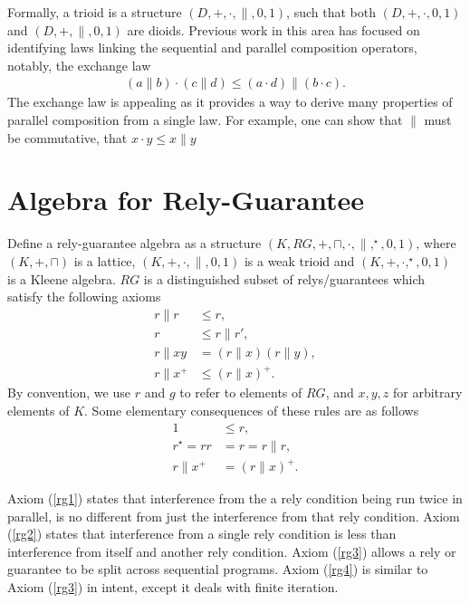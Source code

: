 \documentclass{llncs}
\begin{document}
Formally, a trioid is a structure $(D,+,\cdot,\|,0,1)$, such that
both $(D,+,\cdot,0,1)$ and $(D,+,\|,0,1)$ are dioids. Previous work in
this area has focused on identifying laws linking the sequential and
parallel composition operators, notably, the exchange law
\begin{align*}
  (a \| b) \cdot (c \| d) \le (a \cdot d) \| (b \cdot c).
\end{align*}
The exchange law is appealing as it provides a way to derive many
properties of parallel composition from a single law. For example, one
can show that $\|$ must be commutative, that $x \cdot y \le x \| y$

\newpage
\section{Algebra for Rely-Guarantee}
\label{sec:RG}

Define a rely-guarantee algebra as a structure
$(K,RG,+,\sqcap,\cdot,\|,^\star,0,1)$, where $(K,+,\sqcap)$ is a
lattice, $(K,+,\cdot,\|,0,1)$ is a weak trioid and
$(K,+,\cdot,^\star,0,1)$ is a Kleene algebra. $RG$ is a distinguished
subset of relys/guarantees which satisfy the following axioms
\begin{align}
r\|r &\le r, \label{rg1}\\
r &\le r\|r', \label{rg2}\\
r\|xy &= (r\|x)(r\|y), \label{rg3}\\
r\|x^+ &\le (r\|x)^+ \label{rg4}.
\end{align}
By convention, we use $r$ and $g$ to refer to elements of $RG$, and
$x,y,z$ for arbitrary elements of $K$. Some elementary consequences of these rules are as follows
\begin{align*}
1 &\le r,\\
r^\star = rr &= r = r\|r,\\
r\|x^+ &= (r\|x)^+.
\end{align*}


Axiom (\ref{rg1}) states that interference from the a rely condition
being run twice in parallel, is no different from just the
interference from that rely condition. Axiom (\ref{rg2}) states that
interference from a single rely condition is less than interference
from itself and another rely condition. Axiom (\ref{rg3}) allows a
rely or guarantee to be split across sequential programs. Axiom
(\ref{rg4}) is similar to Axiom (\ref{rg3}) in intent, except it deals
with finite iteration.
\end{document}
